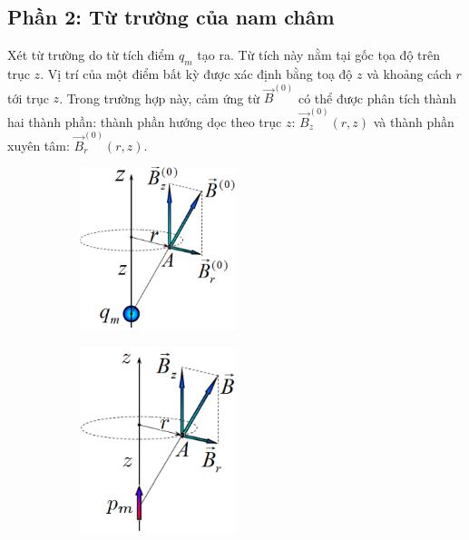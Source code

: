 \subsection*{Phần 2: Từ trường của nam châm}
\noindent Xét từ trường do từ tích điểm $q_m$ tạo ra. Từ tích này nằm tại gốc tọa độ trên trục $z$. Vị trí của một điểm bất kỳ được xác định bằng toạ độ $z$ và khoảng cách $r$ tới trục $z$. Trong trường hợp này, cảm ứng từ $\vec{B}^{(0)}$ có thể được phân tích thành hai thành phần: thành phần hướng dọc theo trục $z$: $\vec{B}^{(0)}_z(r,z)$ và thành phần xuyên tâm: $\vec{B}^{(0)}_r(r,z)$.
\begin{figure}[H]
  \centering
  \begin{subfigure}[b]{0.49\textwidth}
    \centering
    \includegraphics[width=0.5\textwidth]{Figures/Problems/Fig 2.5.png}
  \end{subfigure}
  \hfill
  \begin{subfigure}[b]{0.49\textwidth}
    \centering
    \includegraphics[width=0.5\textwidth]{Figures/Problems/Fig 2.6.png}
  \end{subfigure}
\end{figure}

